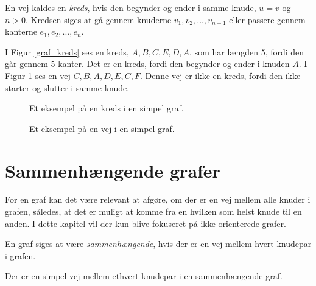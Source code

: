 \begin{defn}
\label{def_kredse}
En vej kaldes en \textit{kreds}, hvis den begynder og ender i samme knude, $u=v$ og $n>0$.
Kredsen siges at gå gennem knuderne $v_1,v_2,...,v_{n-1}$ eller passere gennem kanterne $e_1, e_2,..., e_n$.
\end{defn}

\begin{exmp}
I Figur \ref{graf_kreds} ses en kreds, $A,B,C,E,D,A$, som har længden 5, fordi den går gennem 5 kanter. Det er en kreds, fordi den begynder og ender i knuden $A$.
I Figur \ref{graf_ikke_kreds} ses en vej $C,B,A,D,E,C,F$.
Denne vej er ikke en kreds, fordi den ikke starter og slutter i samme knude. 
\end{exmp}

\begin{figure}[!htb]
   \begin{minipage}{0.48\textwidth}
     \centering
		 
     \caption{Et eksempel på en kreds i en simpel graf.}
     \label{graf_kreds}
   \end{minipage}\hfill
   \begin{minipage}{0.48\textwidth}
     \centering
		 
     \caption{Et eksempel på en vej i en simpel graf.}
     \label{graf_ikke_kreds}
   \end{minipage}
\end{figure}

\section{Sammenhængende grafer}
For en graf kan det være relevant at afgøre, om der er en vej mellem alle knuder i grafen, således, at det er muligt at komme fra en hvilken som helst knude til en anden.
I dette kapitel vil der kun blive fokuseret på ikke-orienterede grafer.

\begin{defn}
\label{def_iosmh}
En graf siges at være \textit{sammenhængende}, hvis der er en vej mellem hvert knudepar i grafen. 
\end{defn}


\begin{thm}
Der er en simpel vej mellem ethvert knudepar i en sammenhængende graf.
\label{smh_satning}
\end{thm}

